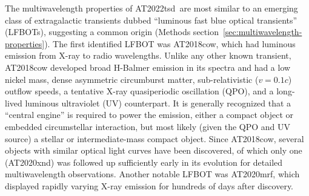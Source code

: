\documentclass{nature_plusfigure}
\newcommand{\at}{AT2022tsd}
\begin{document}
The multiwavelength properties of \at\ are most similar to an emerging class of extragalactic transients dubbed ``luminous fast blue optical transients'' (LFBOTs\cite{Metzger2022}), suggesting a common origin (Methods section~\ref{sec:multiwavelength-properties}). The first identified LFBOT was AT2018cow\cite{Prentice2018}, which had luminous emission from X-ray to radio wavelengths\cite{RiveraSandoval2018,Margutti2019,Ho2019}. Unlike any other known transient, AT2018cow developed broad H-Balmer emission in its spectra\cite{Perley2019} and had a low nickel mass\cite{Perley2019}, dense\cite{Ho2019} asymmetric\cite{Margutti2019,Maund2023} circumburst matter, sub-relativistic ($v=0.1c$)\cite{Ho2019} outflow speeds, a tentative X-ray quasiperiodic oscillation (QPO\cite{Pasham2021,Zhang2022}), and a long-lived luminous ultraviolet (UV) counterpart\cite{Sun2023}. It is generally recognized that a ``central engine'' is required to power the emission, either a compact object\cite{Prentice2018,Perley2019,Margutti2019,Ho2019} or embedded circumstellar interaction\cite{Margutti2019}, but most likely (given the QPO and UV source) a stellar\cite{Margutti2019,Pasham2021} or intermediate-mass\cite{Kuin2019,Perley2019,Zhang2022,Chen2023} compact object. 
Since AT2018cow, several objects with similar optical light curves have been discovered\cite{Coppejans2020,Ho2020_Koala,Perley2021,Yao2022}, of which only one (AT2020xnd\cite{Perley2021}) was followed up sufficiently early in its evolution for detailed multiwavelength observations\cite{Bright2022,Ho2022_AT2020xnd}.
Another notable LFBOT was AT2020mrf\cite{Yao2022}, which displayed rapidly varying X-ray emission for hundreds of days after discovery.
\end{document}
